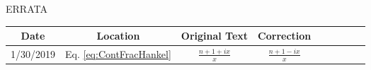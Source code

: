 \thispagestyle{empty} %
\begin{center}
ERRATA
\end{center}

\begin{table*}[h]
\begin{center}
	\renewcommand{\arraystretch}{1.15}
	\setlength{\tabcolsep}{0.10cm}
	\begin{tabular}{ccccccccc}
		\hline 
		\multicolumn{1}{c}{Date} &
		\multicolumn{1}{c}{Location} & 
		\multicolumn{1}{c}{Original Text} &
		\multicolumn{1}{c}{Correction} \\
		\hline
		1/30/2019 & Eq. \ref{eq:ContFracHankel} & $\frac{n+1+ix}{x}$ & $\frac{n+1-ix}{x}$ \\
		\hline
	\end{tabular} 
\end{center}
\end{table*}